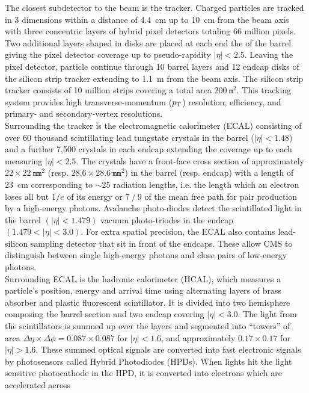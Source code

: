 The closest subdetector to the beam is the tracker. Charged particles are tracked in 
3 dimensions within a distance of 4.4~cm up to 10~cm from the beam axis with three concentric layers of hybrid 
pixel detectors totaling 66 million pixels. Two additional layers shaped in disks are placed at each 
end the of the barrel giving the pixel detector coverage up to pseudo-rapidity $|\eta| < 2.5$.
Leaving the pixel detector, particle continue through 10 barrel layers and 12 endcap disks 
of the silicon strip tracker extending to 1.1~m from the beam axis. The silicon strip tracker
consists of 10 million strips covering a total area $200~\texttt{m}^2$.  This tracking system
provides high transverse-momentum ($p_{\mathrm{T}}$) resolution, efficiency, and primary- and secondary-vertex
resolutions.\\
\indent Surrounding the tracker is the electromagnetic calorimeter (ECAL) consisting of over 60 thousand scintillating 
lead tungstate crystals in the barrel ($|\eta| < 1.48$) and a further 7,500 crystals in each endcap extending
the coverage up to each measuring $|\eta| < 2.5$. The crystals have a front-face cross section
of approximately $22 \times 22~\texttt{mm}^2$ (resp. $28.6 \times 28.6~\texttt{mm}^2$) in the barrel (resp. endcap) with a
length of 23~cm corresponding to $\sim25$ radiation lengths, i.e. the length which an electron loses
all but $1/e$ of its energy or $7⁄9$ of the mean free path for pair production by a high-energy photons.  
Avalanche photo-diodes detect the scintillated light in the barrel $(|\eta| < 1.479)$ vacuum photo-triodes 
in the endcap $(1.479 < |\eta| < 3.0)$. For extra spatial precision, the ECAL also contains lead-silicon 
sampling detector that sit in front of the endcaps. These allow CMS to distinguish between single high-energy 
photons and close pairs of low-energy photons.\\
\indent Surrounding ECAL is the hadronic calorimeter (HCAL), which measures a particle’s position, 
energy and arrival time using alternating layers of brass absorber and plastic fluorescent scintillator.
It is divided into two hemisphere composing the barrel section and two endcap covering $|\eta| < 3.0$. 
The light from the scintillators is summed up over the layers and segmented into 
``towers'' of area $\Delta\eta \times \Delta\phi = 0.087 \times 0.087$ for $|\eta| < 1.6$, 
and approximately $0.17 \times 0.17$ for $|\eta| > 1.6$. These summed optical signals are converted 
into fast electronic signals by photosensors called Hybrid Photodiodes (HPDs). When lights hit the 
light sensitive photocathode in the HPD, it is converted into electrons which are accelerated across 
